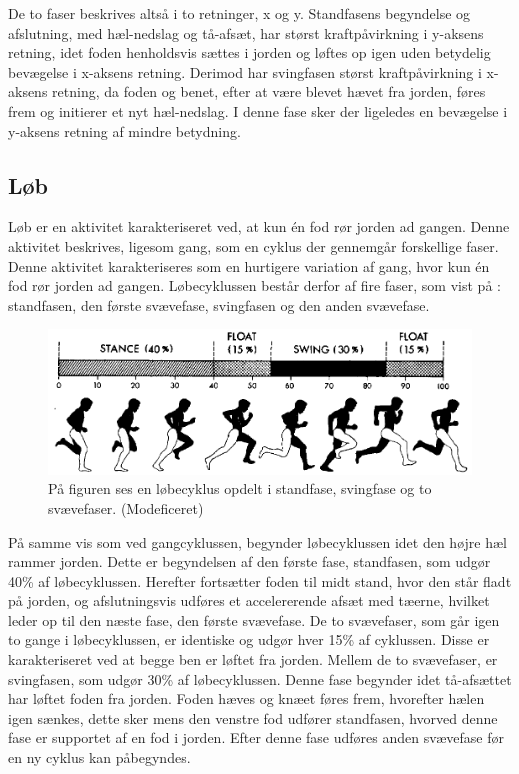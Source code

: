 De to faser beskrives altså i to retninger, x og y. Standfasens begyndelse og afslutning, med hæl-nedslag og tå-afsæt, har størst kraftpåvirkning i y-aksens retning, idet foden henholdsvis sættes i jorden og løftes op igen uden betydelig bevægelse i x-aksens retning. Derimod har svingfasen størst kraftpåvirkning i x-aksens retning, da foden og benet, efter at være blevet hævet fra jorden, føres frem og initierer et nyt hæl-nedslag. I denne fase sker der ligeledes en bevægelse i y-aksens retning af mindre betydning. \citep{Rueterbories2010} 


\subsection{Løb}
Løb er en aktivitet karakteriseret ved, at kun én fod rør jorden ad gangen. Denne aktivitet beskrives, ligesom gang, som en cyklus der gennemgår forskellige faser. Denne aktivitet karakteriseres som en hurtigere variation af gang, hvor kun én fod rør jorden ad gangen. Løbecyklussen består derfor af fire faser, som vist på : standfasen, den første svævefase, svingfasen og den anden svævefase. \citep{Adelaar1986,Novacheck1998}

\begin{figure}[H]
	\centering
	\includegraphics[scale=0.4]{figures/bProblemloesning/loeb_cyklus1.png}
	\caption{På figuren ses en løbecyklus opdelt i standfase, svingfase og to svævefaser. \citep{Adelaar1986} (Modeficeret)}
	\label{fig:loebecyklus}
\end{figure}

På samme vis som ved gangcyklussen, begynder løbecyklussen idet den højre hæl rammer jorden. Dette er begyndelsen af den første fase, standfasen, som udgør 40\% af løbecyklussen. Herefter fortsætter foden til midt stand, hvor den står fladt på jorden, og afslutningsvis udføres et accelererende afsæt med tæerne, hvilket leder op til den næste fase, den første svævefase. \citep{Adelaar1986,Novacheck1998} \newline
De to svævefaser, som går igen to gange i løbecyklussen, er identiske og udgør hver 15\% af cyklussen. Disse er karakteriseret ved at begge ben er løftet fra jorden. \citep{Adelaar1986,Novacheck1998} \newline
Mellem de to svævefaser, er svingfasen, som udgør 30\% af løbecyklussen. Denne fase begynder idet tå-afsættet har løftet foden fra jorden. Foden hæves og knæet føres frem, hvorefter hælen igen sænkes, dette sker mens den venstre fod udfører standfasen, hvorved denne fase er supportet af en fod i jorden. Efter denne fase udføres anden svævefase før en ny cyklus kan påbegyndes. \citep{Adelaar1986,Novacheck1998}

